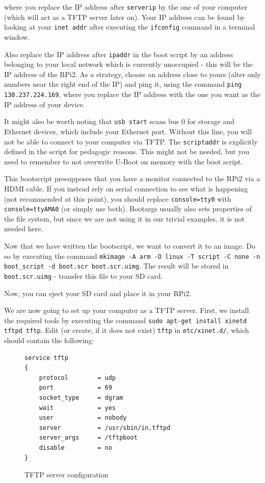 \documentclass[a4paper,11pt,reqno]{amsart}
\begin{document}
{where you replace the IP address after \texttt{serverip} by the one of your computer (which will act as a TFTP server later on). Your IP address can be found by looking at your \texttt{inet addr} after executing the \texttt{ifconfig} command in a terminal window.

Also replace the IP address after \texttt{ipaddr} in the boot script by an address belonging to your local network which is currently unoccupied - this will be the IP address of the RPi2. As a strategy, choose an address close to yours (alter only numbers near the right end of the IP) and ping it, using the command \texttt{ping 130.237.224.169}, where you replace the IP address with the one you want as the IP address of your device.

It might also be worth noting that \texttt{usb start} scans bus 0 for storage and Ethernet devices, which include your Ethernet port. Without this line, you will not be able to connect to your computer via TFTP. The \texttt{scriptaddr} is explicitly defined in the script for pedagogic reasons. This might not be needed, but you need to remember to not overwrite U-Boot on memory with the boot script. 

This bootscript presupposes that you have a monitor connected to the RPi2 via a HDMI cable. If you instead rely on serial connection to see what is happening (not recommended at this point), you should replace \texttt{console=tty0} with \texttt{console=ttyAMA0} (or simply use both). Bootargs usually also sets properties of the file system, but since we are not using it in our trivial examples, it is not needed here.

Now that we have written the bootscript, we want to convert it to an image. Do so by executing the command \texttt{mkimage -A arm -O linux -T script -C none -n boot\_script -d boot.scr boot.scr.uimg}. The result will be stored in \texttt{boot.scr.uimg} - transfer this file to your SD card.

Now, you can eject your SD card and place it in your RPi2.

We are now going to set up your computer as a TFTP server. First, we install the required tools by executing the command \texttt{sudo apt-get install xinetd tftpd tftp}. Edit (or create, if it does not exist) \texttt{tftp} in \texttt{etc/xinet.d/}, which should contain the following:

\begin{figure}[hb]
\begin{center}
\begin{BVerbatim}
service tftp
{
    protocol        = udp
    port            = 69
    socket_type     = dgram
    wait            = yes
    user            = nobody
    server          = /usr/sbin/in.tftpd
    server_args     = /tftpboot
    disable         = no
}
\end{BVerbatim}
\end{center}
\caption{TFTP server configuration}
\label{fig:server}
\end{figure}

}
\end{document}
